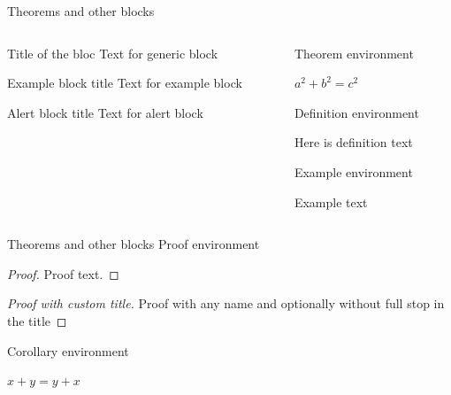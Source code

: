 \documentclass[11pt,t,aspectratio=1610,nofootline]{beamer}
\begin{document}
\begin{frame}{Theorems and other blocks}
	\begin{columns}[t]
		\begin{column}{.5\textwidth}
			\begin{block}{Title of the bloc}
			Text for generic block
			\end{block}

			\vspace{11pt}
			\begin{exampleblock}{Example block title}
			Text for example block
			\end{exampleblock}

			\vspace{11pt}
			\begin{alertblock}{Alert block title}
			Text for alert block
			\end{alertblock}
		\end{column}
		\begin{column}{.5\textwidth}
			Theorem environment
			\begin{theorem}
				$a^2 + b^2 = c^2$
			\end{theorem}

			\vspace{11pt}
			Definition environment
			\begin{definition}
				Here is definition text
			\end{definition}

			\vspace{11pt}	
			Example environment
			\begin{example}
				Example text
			\end{example}
		\end{column}
	\end{columns}	
\end{frame}


\begin{frame}{Theorems and other blocks}
Proof environment
	\begin{proof}
	Proof text.
	\end{proof}
	
	\begin{proof}[Proof with custom title\nopunct]
	Proof with any name and optionally without full stop in the title
	\end{proof}

\vspace{11pt}	
Corollary environment
	\begin{corollary}
	$ x + y = y + x  $
	\end{corollary}
\end{frame}
\end{document}
